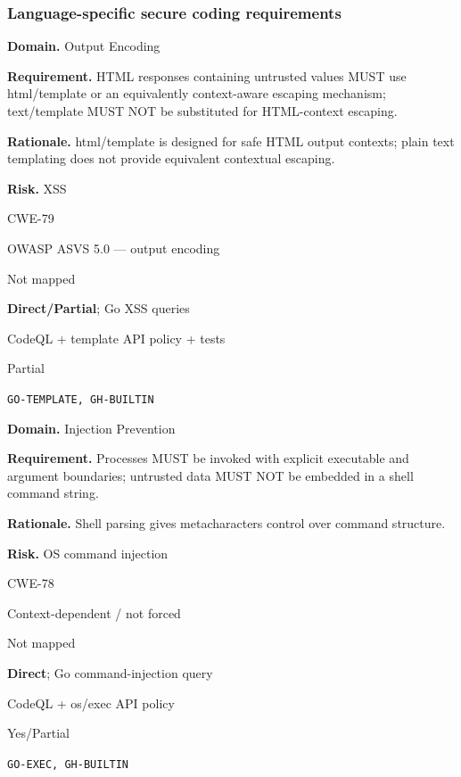 \documentclass[10pt,letterpaper]{article}
\newcommand{\prioritybadge}[2]{\tcbox[on line,boxrule=0pt,arc=1.2mm,boxsep=0.7mm,left=1mm,right=1mm,top=0.4mm,bottom=0.4mm,colback=#2!12,coltext=#2]{\scriptsize\bfseries #1}}
\begin{document}
\subsubsection*{Language-specific secure coding requirements}

\begin{rulebox}[title={\texttt{SCS-GO-OUTPUT-001} \hfill \prioritybadge{High Priority}{High}}]
\textbf{Domain.} Output Encoding

\textbf{Requirement.} HTML responses containing untrusted values MUST use html/template or an equivalently context-aware escaping mechanism; text/template MUST NOT be substituted for HTML-context escaping.

\textbf{Rationale.} html/template is designed for safe HTML output contexts; plain text templating does not provide equivalent contextual escaping.

\textbf{Risk.} XSS

\begin{description}[leftmargin=2.65cm,labelwidth=2.3cm,style=nextline,itemsep=1pt,topsep=3pt]
  \item[CWE] CWE-79
  \item[OWASP] OWASP ASVS 5.0 --- output encoding
  \item[CERT] Not mapped
  \item[CodeQL] \textbf{Direct/Partial}; Go XSS queries
  \item[Enforcement] CodeQL + template API policy + tests
  \item[Automation] Partial
  \item[Sources] \texttt{GO-TEMPLATE, GH-BUILTIN}
\end{description}
\end{rulebox}

\begin{rulebox}[title={\texttt{SCS-GO-INJ-001} \hfill \prioritybadge{Critical Control}{Critical}}]
\textbf{Domain.} Injection Prevention

\textbf{Requirement.} Processes MUST be invoked with explicit executable and argument boundaries; untrusted data MUST NOT be embedded in a shell command string.

\textbf{Rationale.} Shell parsing gives metacharacters control over command structure.

\textbf{Risk.} OS command injection

\begin{description}[leftmargin=2.65cm,labelwidth=2.3cm,style=nextline,itemsep=1pt,topsep=3pt]
  \item[CWE] CWE-78
  \item[OWASP] Context-dependent / not forced
  \item[CERT] Not mapped
  \item[CodeQL] \textbf{Direct}; Go command-injection query
  \item[Enforcement] CodeQL + os/exec API policy
  \item[Automation] Yes/Partial
  \item[Sources] \texttt{GO-EXEC, GH-BUILTIN}
\end{description}
\end{rulebox}
\end{document}
